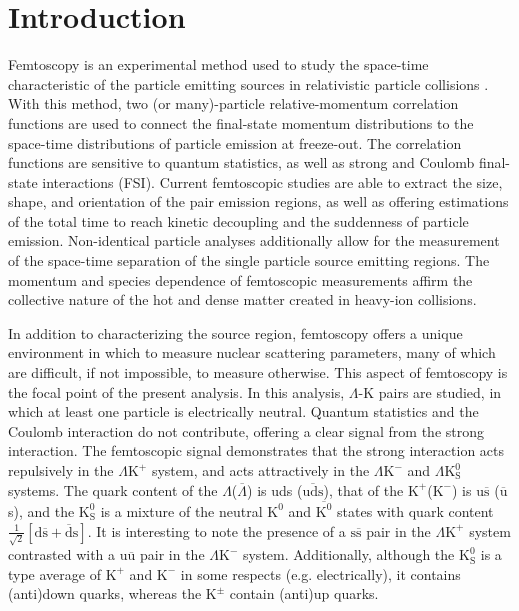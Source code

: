 \documentclass[ALICE,manyauthors]{cernphprep}
\newcommand{\Lam}{$\Lambda$\xspace}
\newcommand{\ALam}{$\overline{\Lambda}$\xspace}
\newcommand{\KchP}{$\mathrm{K^{+}}$\xspace}
\newcommand{\KchM}{$\mathrm{K^{-}}$\xspace}
\newcommand{\Kpm}{$\mathrm{K^{\pm}}$\xspace}
\newcommand{\Ks}{$\mathrm{K^{0}_{S}}$\xspace}
\newcommand{\LamKchP}{$\Lambda\mathrm{K^{+}}$\xspace}
\newcommand{\LamKchM}{$\Lambda\mathrm{K^{-}}$\xspace}
\newcommand{\LamKs}{$\Lambda\mathrm{K^{0}_{S}}$\xspace}
\begin{document}
\section{Introduction}
\label{sec:Introduction}

Femtoscopy is an experimental method used to study the space-time characteristic of the particle emitting sources in relativistic particle collisions \cite{Lisa:2005dd}.  
With this method, two (or many)-particle relative-momentum correlation functions are used to connect the final-state momentum distributions to the space-time distributions of particle emission at freeze-out.  
The correlation functions are sensitive to quantum statistics, as well as strong and Coulomb final-state interactions (FSI).  
Current femtoscopic studies are able to extract the size, shape, and orientation of the pair emission regions, as well as offering estimations of the total time to reach kinetic decoupling and the suddenness of particle emission.
Non-identical particle analyses additionally allow for the measurement of the space-time separation of the single particle source emitting regions.
The momentum and species dependence of femtoscopic measurements affirm the collective nature of the hot and dense matter created in heavy-ion collisions.

In addition to characterizing the source region, femtoscopy offers a unique environment in which to measure nuclear scattering parameters, many of which are difficult, if not impossible, to measure otherwise.  
This aspect of femtoscopy is the focal point of the present analysis. 
In this analysis, \Lam-K pairs are studied, in which at least one particle is electrically neutral.  
Quantum statistics and the Coulomb interaction do not contribute, offering a clear signal from the strong interaction.
The femtoscopic signal demonstrates that the strong interaction acts repulsively in the \LamKchP system, and acts attractively in the \LamKchM and \LamKs systems.
The quark content of the \Lam (\ALam) is uds ($\overline{\mathrm{uds}}$), that of the \KchP (\KchM) is u$\overline{\mathrm{s}}$ ($\overline{\mathrm{u}}$s), and the \Ks is a mixture of the neutral $\mathrm{K}^{0}$ and $\overline{\mathrm{K}^{0}}$ states with quark content $\frac{1}{\sqrt{2}}\left[\mathrm{d\overline{s} + \overline{d}s}\right]$.
It is interesting to note the presence of a $\mathrm{s\overline{s}}$ pair in the \LamKchP system contrasted with a $\mathrm{u\overline{u}}$ pair in the \LamKchM system.
Additionally, although the \Ks is a type average of \KchP and \KchM in some respects (e.g. electrically), it contains (anti)down quarks, whereas the \Kpm contain (anti)up quarks.
\end{document}

